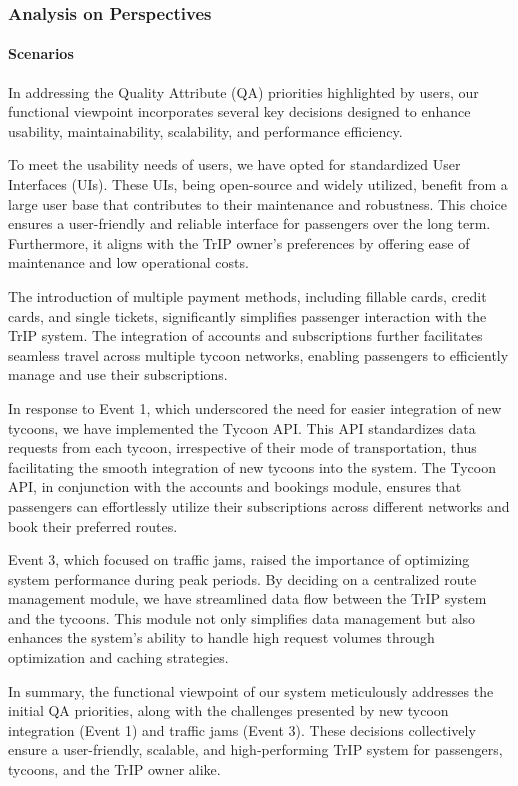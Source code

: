 \subsubsection{Analysis on Perspectives}


\paragraph{Scenarios}


In addressing the Quality Attribute (QA) priorities highlighted by users, our functional viewpoint incorporates several key decisions designed to enhance usability, maintainability, scalability, and performance efficiency.

To meet the usability needs of users, we have opted for standardized User Interfaces (UIs). These UIs, being open-source and widely utilized, benefit from a large user base that contributes to their maintenance and robustness. This choice ensures a user-friendly and reliable interface for passengers over the long term. Furthermore, it aligns with the TrIP owner's preferences by offering ease of maintenance and low operational costs.

The introduction of multiple payment methods, including fillable cards, credit cards, and single tickets, significantly simplifies passenger interaction with the TrIP system. The integration of accounts and subscriptions further facilitates seamless travel across multiple tycoon networks, enabling passengers to efficiently manage and use their subscriptions.

In response to Event 1, which underscored the need for easier integration of new tycoons, we have implemented the Tycoon API. This API standardizes data requests from each tycoon, irrespective of their mode of transportation, thus facilitating the smooth integration of new tycoons into the system. The Tycoon API, in conjunction with the accounts and bookings module, ensures that passengers can effortlessly utilize their subscriptions across different networks and book their preferred routes.

Event 3, which focused on traffic jams, raised the importance of optimizing system performance during peak periods. By deciding on a centralized route management module, we have streamlined data flow between the TrIP system and the tycoons. This module not only simplifies data management but also enhances the system's ability to handle high request volumes through optimization and caching strategies.

In summary, the functional viewpoint of our system meticulously addresses the initial QA priorities, along with the challenges presented by new tycoon integration (Event 1) and traffic jams (Event 3). These decisions collectively ensure a user-friendly, scalable, and high-performing TrIP system for passengers, tycoons, and the TrIP owner alike.